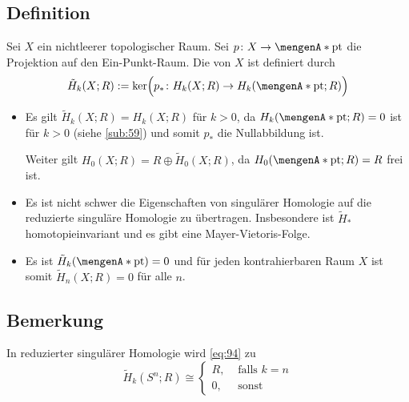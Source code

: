 \subsection[Definition: Reduzierte Homologie]{Definition} %
\label{sub:95}
Sei $X$ ein nichtleerer topologischer Raum. Sei $p \colon X  \to \set{\mathrm{pt}}$ die Projektion auf den Ein-Punkt-Raum. Die  von $X$ 
ist definiert durch 
\[
	\tilde{H}_k(X;R) := \ker \enbrace[\Big]{ p_* \colon H_k(X;R) \to H_k(\set{\mathrm{pt}};R )} 
\]
\begin{itemize}
	\item Es gilt $\tilde{H}_k(X;R) =H_k(X;R)$ für $k>0$, da $H_k \enbrace*{\set{\mathrm{pt}};R }=0$ ist für $k>0$ (siehe \ref{sub:59}) und somit $p_*$ die Nullabbildung ist.
	
	Weiter gilt $H_0(X;R) = R \oplus \tilde{H}_0(X;R)$, da $H_0(\set{\mathrm{pt}};R)=R$ frei ist.
	\item Es ist nicht schwer die Eigenschaften von singulärer Homologie auf die reduzierte singuläre Homologie zu übertragen. Insbesondere ist $\tilde{H}_*$ 
	homotopieinvariant und es gibt eine Mayer-Vietoris-Folge.
	\item Es ist $\tilde{H}_k \enbrace*{\set{\mathrm{pt}}}=0$ und für jeden kontrahierbaren Raum $X$ ist somit $\tilde{H}_n(X;R)=0$ für alle $n$.
\end{itemize}

\subsection[Bemerkung: Die Aussage von Satz \ref{sub:94} in reduzierter Homologie]{Bemerkung} %
\label{sub:96}
In reduzierter singulärer Homologie wird \eqref{eq:94} zu
\begin{equation*}
	\tilde{H}_k(S^n;R) \cong \begin{cases}
		R, &\text{ falls }k=n\\
		0 , &\text{ sonst}
	\end{cases} \label{eq:96}\tag{\#\#}
\end{equation*}

